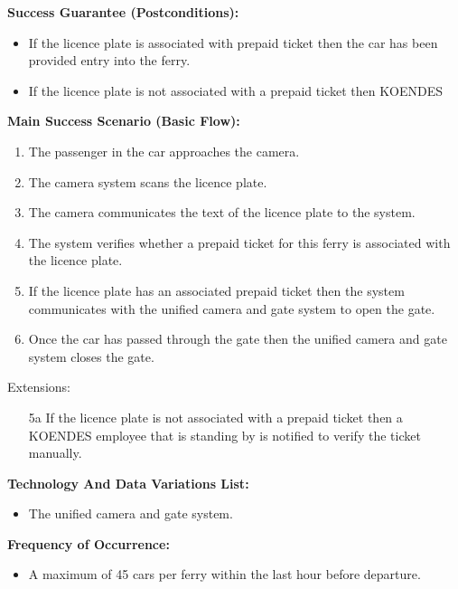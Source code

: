 \textbf{Success Guarantee (Postconditions):} 
\begin{itemize}
\item If the licence plate is associated with prepaid ticket then the car has been provided entry into the ferry.
\item If the licence plate is not associated with a prepaid ticket then KOENDES 
\end{itemize}

\textbf{Main Success Scenario (Basic Flow):}
\begin{enumerate}
\item The passenger in the car approaches the camera.
\item The camera system scans the licence plate.
\item The camera communicates the text of the licence plate to the system.
\item The system verifies whether a prepaid ticket for this ferry is associated with the licence plate.
\item If the licence plate has an associated prepaid ticket then the system communicates with the unified camera and gate system to open the gate. 
\item Once the car has passed through the gate then the unified camera and gate system closes the gate.
\end{enumerate}
Extensions:
\begin{enumerate}
\item[5a]If the licence plate is not associated with a prepaid ticket then a KOENDES employee that is standing by is notified to verify the ticket manually. 
\end{enumerate}


\textbf{Technology And Data Variations List:} 
\begin{itemize}
    \item The unified camera and gate system.
    \end{itemize}
\textbf{Frequency of Occurrence:} 
\begin{itemize}
    \item A maximum of 45 cars per ferry within the last hour before departure.
\end{itemize} 

